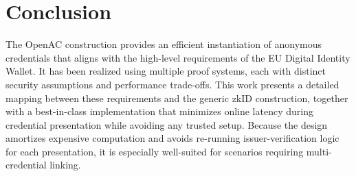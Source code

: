 \documentclass{article}
\newcommand{\kwnote}[1]{\textsf{\color{red}{[{Keewoo: #1}]}}}
\begin{document}
\section{Conclusion}
\label{sec:conclusion}


The OpenAC construction provides an efficient instantiation of anonymous credentials that aligns with 
the high-level requirements of the EU Digital Identity Wallet. It has been realized using multiple 
proof systems, each with distinct security assumptions and performance trade-offs. This work presents 
a detailed mapping between these requirements and the generic zkID construction, together with a 
best-in-class implementation that minimizes online latency during credential presentation while 
avoiding any trusted setup. Because the design amortizes expensive computation and avoids re-running 
issuer-verification logic for each presentation, it is especially well-suited for scenarios requiring 
multi-credential linking.
\end{document}
